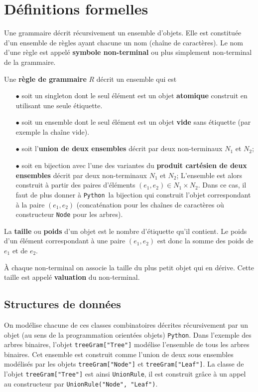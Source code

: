 \documentclass[11pt]{article}
\renewcommand{\emph}[1]{\textbf{#1}}
\newcommand{\Python}{\texttt{Python}}
\begin{document}
\section{Définitions formelles}

Une grammaire décrit récursivement un ensemble d'objets. Elle est constituée
d'un ensemble de règles ayant chacune un nom (chaîne de caractères). Le nom
d'une règle est appelé \emph{symbole non-terminal} ou plus simplement
non-terminal de la grammaire.  \medskip

Une \emph{règle de grammaire} $R$ décrit un ensemble qui est
\begin{itemize}
\item[$\bullet$] soit un singleton dont le seul élément est un objet
  \emph{atomique} construit en utilisant une seule étiquette.
\item[$\bullet$] soit un ensemble dont le seul élément est un objet
  \emph{vide} sans étiquette (par exemple la chaîne vide).
\item[$\bullet$] soit l'\emph{union de deux ensembles} décrit par deux
  non-terminaux $N_1$ et $N_2$;
\item[$\bullet$] soit en bijection avec l'une des variantes du \emph{produit
    cartésien de deux ensembles} décrit par deux non-terminaux $N_1$ et $N_2$;
  L'ensemble est alors construit à partir des paires d'éléments $(e_1, e_2)
  \in N_1 \times N_2$. Dans ce cas, il faut de plus donner à \Python\ la
  bijection qui construit l'objet correspondant à la paire $(e_1, e_2)$
  (concaténation pour les chaînes de caractères où constructeur \texttt{Node}
  pour les arbres).
\end{itemize}
\medskip

La \emph{taille} ou \emph{poids} d'un objet est le nombre d'étiquette qu'il
contient. Le poids d'un élément correspondant à une paire $(e_1, e_2)$ est
donc la somme des poids de $e_1$ et de $e_2$.

À chaque non-terminal on associe la taille du plus petit objet qui en dérive.
Cette taille est appelé \emph{valuation} du non-terminal.


\subsection{Structures de données}

On modélise chacune de ces classes combinatoires décrites récursivement par un
objet (au sens de la programmation orientées objets) \Python. Dans l'exemple
des arbres binaires, l'objet \verb+treeGram["Tree"]+ modélise l'ensemble de
tous les arbres binaires. Cet ensemble est construit comme l'union de deux
sous ensembles modélisés par les objets \verb+treeGram["Node"]+ et
\verb+treeGram["Leaf"]+.  La classe de l'objet \verb+treeGram["Tree"]+ est
ainsi \verb+UnionRule+, il est construit grâce à un appel au constructeur par
\verb+UnionRule("Node", "Leaf")+.
\end{document}
